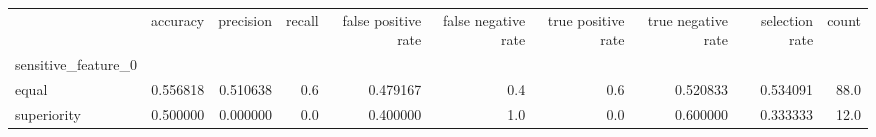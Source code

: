 \begin{tabular}{lrrrrrrrrr}
\toprule
{} &  accuracy &  precision &  recall &  false positive rate &  false negative rate &  true positive rate &  true negative rate &  selection rate &  count \\
sensitive\_feature\_0 &           &            &         &                      &                      &                     &                     &                 &        \\
\midrule
equal               &  0.556818 &   0.510638 &     0.6 &             0.479167 &                  0.4 &                 0.6 &            0.520833 &        0.534091 &   88.0 \\
superiority         &  0.500000 &   0.000000 &     0.0 &             0.400000 &                  1.0 &                 0.0 &            0.600000 &        0.333333 &   12.0 \\
\bottomrule
\end{tabular}
